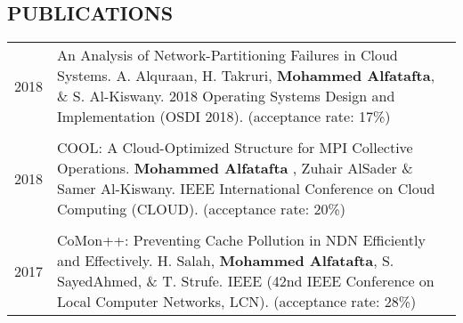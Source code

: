 
    \subsection*{PUBLICATIONS}
    \begin{tabularx}{\linewidth}{ r X }
        	2018 & An Analysis of Network-Partitioning Failures in Cloud Systems. A. Alquraan, H. Takruri, \textbf{Mohammed Alfatafta}, \& S. Al-Kiswany. 2018 Operating Systems Design and Implementation (OSDI 2018). 
                (acceptance rate: 17\%)
        \\\\
    	2018 & COOL: A Cloud-Optimized Structure for MPI Collective Operations. \textbf{Mohammed Alfatafta} , Zuhair AlSader \& Samer Al-Kiswany. IEEE International Conference on Cloud Computing (CLOUD). 
                 (acceptance rate: 20\%)
        \\\\
	    2017 & CoMon++: Preventing Cache Pollution in NDN Efficiently and Effectively. H. Salah, \textbf{Mohammed Alfatafta}, S. SayedAhmed, \& T. Strufe.  IEEE (42nd IEEE Conference on Local Computer Networks, LCN).
        		(acceptance rate: 28\%)
  	\end{tabularx}